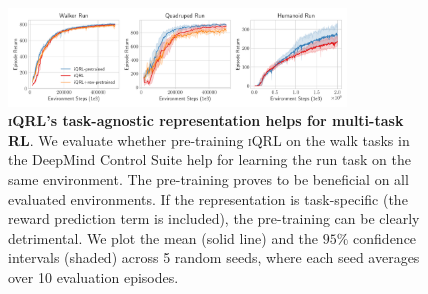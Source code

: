 \documentclass{article}
\theoremstyle{plain}
\theoremstyle{definition}
\theoremstyle{remark}
\newcommand{\our}{\textsc{iQRL}\xspace}
\begin{document}
\begin{figure}[ht]
	\vskip 0.2in
	\begin{center}
		\centerline{\includegraphics[width=0.8\textwidth]{./figs/task-agnostic-ablation.pdf}}
		\caption{\textbf{\our's task-agnostic representation helps for multi-task RL}. We evaluate whether pre-training \our on the walk tasks in the DeepMind Control Suite help for learning the run task on the same environment. The pre-training proves to be beneficial on all evaluated environments. If the representation is task-specific (the reward prediction term is included), the pre-training can be clearly detrimental. We plot the mean (solid line) and the $95\%$ confidence intervals (shaded) across 5 random seeds, where each seed averages over 10 evaluation episodes.}
		\label{fig:multi-task-pretraining}
	\end{center}
	\vskip -0.2in
\end{figure}
\end{document}
